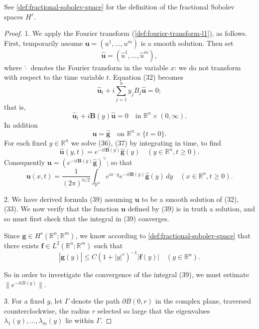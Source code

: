 See \cref{def:fractional-sobolev-space} for the definition of the fractional Sobolev spaces $H^s$.

\begin{proof}
1. We apply the Fourier transform (\cref{def:fourier-transform-l1}), as follows. First, temporarily assume $\mathbf{u} = (u^1, \ldots, u^m)$ is a smooth solution. Then set
\[
\hat{\mathbf{u}} = (\hat{u}^1, \ldots, \hat{u}^m),
\]
where $\hat{\cdot}$ denotes the Fourier transform in the variable $x$: we do not transform with respect to the time variable $t$. Equation (32) becomes
\[
\hat{\mathbf{u}}_t + i \sum_{j=1}^n y_j B_j \hat{\mathbf{u}} = 0;
\]
that is,
\[
\hat{\mathbf{u}}_t + i\mathbf{B}(y)\hat{\mathbf{u}} = 0 \quad \text{in } \mathbb{R}^n \times (0, \infty).
\tag{36}
\]
In addition
\[
\hat{\mathbf{u}} = \hat{\mathbf{g}} \quad \text{on } \mathbb{R}^n \times \{t = 0\}.
\tag{37}
\]
For each fixed $y \in \mathbb{R}^n$ we solve (36), (37) by integrating in time, to find
\[
\hat{\mathbf{u}}(y, t) = e^{-it\mathbf{B}(y)} \hat{\mathbf{g}}(y) \quad (y \in \mathbb{R}^n, t \geq 0).
\tag{38}
\]
Consequently $\mathbf{u} = (e^{-it\mathbf{B}(y)} \hat{\mathbf{g}})^\vee$; so that
\[
\mathbf{u}(x, t) = \frac{1}{(2\pi)^{n/2}} \int_{\mathbb{R}^n} e^{ix \cdot y} e^{-it\mathbf{B}(y)} \hat{\mathbf{g}}(y) \, dy \quad (x \in \mathbb{R}^n, t \geq 0).
\tag{39}
\]

2. We have derived formula (39) assuming $\mathbf{u}$ to be a smooth solution of (32), (33). We now verify that the function $\mathbf{u}$ defined by (39) is in truth a solution, and so must first check that the integral in (39) converges.

Since $\mathbf{g} \in H^s(\mathbb{R}^n; \mathbb{R}^m)$, we know according to \cref{def:fractional-sobolev-space} that there exists $\mathbf{f} \in L^2(\mathbb{R}^n; \mathbb{R}^m)$ such that
\[
|\hat{\mathbf{g}}(y)| \leq C(1 + |y|^s)^{-1} |\mathbf{f}(y)| \quad (y \in \mathbb{R}^n).
\tag{40}
\]

So in order to investigate the convergence of the integral (39), we must estimate $\|e^{-itB(y)}\|$.

3. For a fixed $y$, let $\Gamma$ denote the path $\partial B(0, r)$ in the complex plane, traversed counterclockwise, the radius $r$ selected so large that the eigenvalues $\lambda_1(y), \ldots, \lambda_m(y)$ lie within $\Gamma$.


\end{proof}
